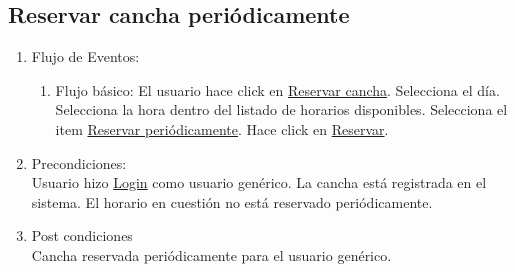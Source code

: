 \documentclass[a4paper,11pt]{article}
\begin{document}
\subsection{Reservar cancha periódicamente}
\begin{enumerate}


    \begin{enumerate}
    \item Descripción breve: \\
        Este caso de uso describe la reserva periódica de una cancha determinada.
    \item Actores \\
        Usuario genérico.
    \item Disparadores: \\
        El usuario hace click en \underline{Reservar cancha}
        dentro del menu de la cancha.
    \end{enumerate}

    \item Flujo de Eventos: 

    \begin{enumerate}

        \item Flujo básico:
            El usuario hace click en \underline{Reservar cancha}.
            Selecciona el día.
            Selecciona la hora dentro del listado de horarios disponibles.
            Selecciona el item \underline{Reservar periódicamente}.
            Hace click en \underline{Reservar}.
    \end{enumerate}

    \item Precondiciones: \\
        Usuario hizo \underline{Login} como usuario genérico.
        La cancha está registrada en el sistema.
        El horario en cuestión no está reservado periódicamente.

    \item Post condiciones \\
        Cancha reservada periódicamente para el usuario genérico.

\end{enumerate}


\end{document}

